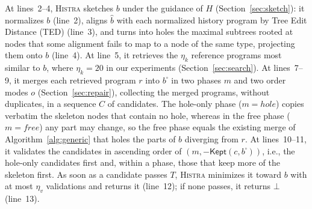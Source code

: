 \documentclass[10pt,conference]{IEEEtran}
\begin{document}
At lines~2--4, \textsc{Histra} sketches $b$ under the guidance of $H$ (Section~\ref{sec:sketch}): it normalizes $b$ (line~2), aligns $\hat{b}$ with each normalized history program by Tree Edit Distance (TED) (line~3), and turns into holes the maximal subtrees rooted at nodes that some alignment fails to map to a node of the same type, projecting them onto $b$ (line~4). At line~5, it retrieves the $\eta_k$ reference programs most similar to $b$, where $\eta_k = 20$ in our experiments (Section~\ref{sec:search}). At lines~7--9, it merges each retrieved program $r$ into $b^{\square}$ in two phases $m$ and two order modes $o$ (Section~\ref{sec:repair}), collecting the merged programs, without duplicates, in a sequence $C$ of candidates. The hole-only phase ($m = \mathit{hole}$) copies verbatim the skeleton nodes that contain no hole, whereas in the free phase ($m = \mathit{free}$) any part may change, so the free phase equals the existing merge of Algorithm~\ref{alg:generic} that holes the parts of $b$ diverging from $r$. At lines~10--11, it validates the candidates in ascending order of $(m, -\mathsf{Kept}(c, b^{\square}))$, i.e., the hole-only candidates first and, within a phase, those that keep more of the skeleton first. As soon as a candidate passes $T$, \textsc{Histra} minimizes it toward $b$ with at most $\eta_v$ validations and returns it (line~12); if none passes, it returns $\bot$ (line~13).
\end{document}
